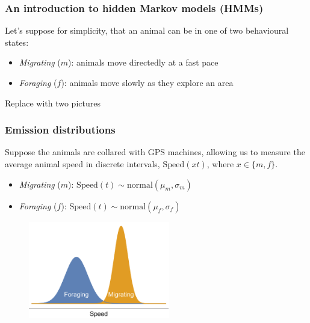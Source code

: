 \documentclass[main.tex]{subfiles}
\begin{document}
\begin{frame}
\frametitle{An introduction to hidden Markov models (HMMs)}

Let's suppose for simplicity, that an animal can be in one of two behavioural states:

\vspace{0.5cm}

\begin{itemize}
    \item \textit{Migrating} ($m$): animals move directedly at a fast pace
    \item \textit{Foraging} ($f$): animals move slowly as they explore an area
\end{itemize}

\vspace{0.5cm}

Replace with two pictures
    
\end{frame}

\begin{frame}
\frametitle{Emission distributions}
Suppose the animals are collared with GPS machines, allowing us to measure the average animal speed in discrete intervals, $\text{Speed}(xt)$, where $x\in\{m,f\}$.

\vspace{0.5cm}

\begin{itemize}
    \item \textit{Migrating} ($m$): $\text{Speed}(t)\sim \text{normal}(\mu_m,\sigma_m)$
    \item \textit{Foraging} ($f$): $\text{Speed}(t)\sim \text{normal}(\mu_f,\sigma_f)$
\end{itemize}

\begin{figure}
    \centering
    \includegraphics[width=0.55\textwidth]{figures/foraging_migrating.pdf}
\end{figure}
    
\end{frame}
\end{document}
